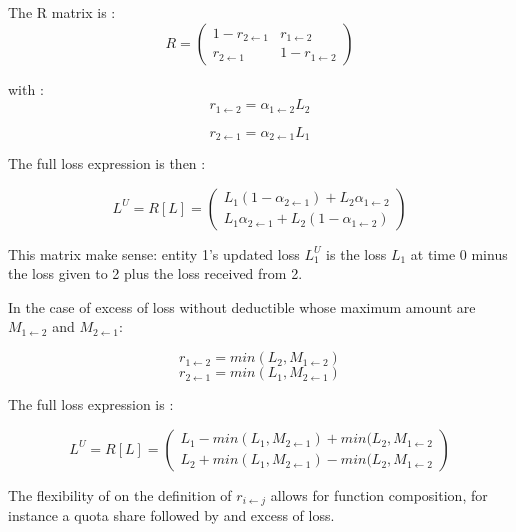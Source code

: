 The R matrix is :
\begin{equation}
R = 
\begin{pmatrix}
1 - r_{2 \gets 1} & r_{1 \gets 2}\\
r_{2 \gets 1} & 1 - r_{1 \gets 2}
\end{pmatrix}
\end{equation}

with :
\begin{equation}
    r_{1 \gets 2} = \alpha_{1 \gets 2} L_2
\end{equation}

\begin{equation}
    r_{2 \gets 1} = \alpha_{2 \gets 1} L_1
\end{equation}

The full loss expression is then :

\begin{equation}
L^U = R[L] = 
\begin{pmatrix}
L_1 (1 - \alpha_{2 \gets 1}) + L_2 \alpha_{1 \gets 2} \\
L_1 \alpha_{2 \gets 1} + L_2 (1 - \alpha_{1 \gets 2})
\end{pmatrix}
\end{equation}

This matrix make sense: entity 1's updated loss $L_1^U$ is the loss $L_1$ at time 0 minus the loss given to 2 plus the loss received from 2.

In the case of excess of loss without deductible whose maximum amount are $M_{1 \gets 2}$ and $M_{2 \gets 1}$:

\begin{equation}
    r_{1 \gets 2} = min(L_2, M_{1 \gets 2})
\end{equation}
\begin{equation}
    r_{2 \gets 1} = min(L_1, M_{2 \gets 1})
\end{equation}

The full loss expression is :

\begin{equation}
L^U = R[L] = 
\begin{pmatrix}
L_1 - min(L_1, M_{2 \gets 1}) + min(L_2, M_{1 \gets 2} \\
L_2 + min(L_1, M_{2 \gets 1}) - min(L_2, M_{1 \gets 2}
\end{pmatrix}
\end{equation}

The flexibility of on the definition of $r_{i \gets j}$ allows for function composition, for instance a quota share followed by and excess of loss.

